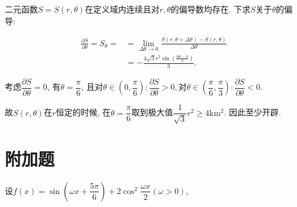 \documentclass[8pt]{article}
\begin{document}
\begin{enumerate}[label=\defmath{(\arabic*)}]
					二元函数\(S=S(r, \theta)\)在定义域内连续且对\(r, \theta\)的偏导数均存在. 下求\(S\)关于\(\theta\)的偏导:

					\begin{align*}
						\frac{\partial S}{\partial \theta} = S_{\theta} =  &= \lim_{\Delta \theta \rightarrow 0}\frac{S(r, \theta + \Delta \theta) - S(r, \theta)}{\Delta \theta}\\
						&= -\frac{4\sqrt{3} r^2 \sin \left(\frac{6\theta - \pi}{3}\right)}{3}.
					\end{align*}

					考虑\(\dfrac{\partial S}{\partial \theta} = 0\), 有\(\theta = \dfrac{\pi}{6}\), 且对\(\theta \in \left(0, \dfrac{\pi}{6}\right): \dfrac{\partial S}{\partial \theta}>0, \)对\(\theta \in \left(\dfrac{\pi}{6}, \dfrac{\pi}{3}\right): \dfrac{\partial S}{\partial \theta}<0\).

					故\(S(r, \theta)\)在\(r\)恒定的时候, 在\(\theta = \dfrac{\pi}{6}\)取到极大值\(\dfrac{1}{\sqrt{3}}r^2 \geq 4 \mathrm{km^2}\). 因此至少开辟.

			\end{enumerate}

	\section{附加题}
		设\(f(x)=\sin \left(\omega x + \dfrac{5\pi}{6}\right) + 2 \cos^2 \dfrac{\omega x}{2} (\omega > 0)\),
\end{document}
